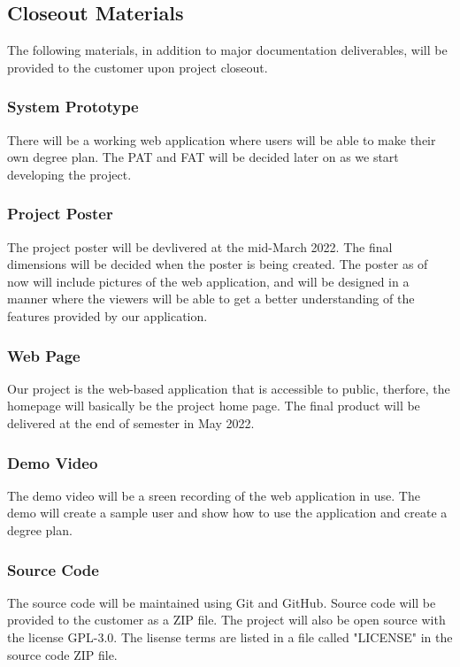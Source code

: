 \subsection{Closeout Materials}
The following materials, in addition to major documentation deliverables, will be provided to the customer upon project closeout.

\subsubsection{System Prototype}
There will be a working web application where users will be able to make their own degree plan. The PAT and FAT will be decided later on as we start developing the project.

\subsubsection{Project Poster}
The project poster will be devlivered at the mid-March 2022. The final dimensions will be decided when the poster is being created. The poster as of now will include pictures of the web application, and will be designed in a manner where the viewers will be able to get a better understanding of the features provided by our application.

\subsubsection{Web Page}
Our project is the web-based application that is accessible to public, therfore, the homepage will basically be the project home page. The final product will be delivered at the end of semester in May 2022.

\subsubsection{Demo Video}
The demo video will be a sreen recording of the web application in use. The demo will create a sample user and show how to use the application and create a degree plan. 

\subsubsection{Source Code}
The source code will be maintained using Git and GitHub. Source code will be provided to the customer as a ZIP file. The project will also be open source with the license GPL-3.0. The lisense terms are listed in a file called "LICENSE" in the source code ZIP file.

